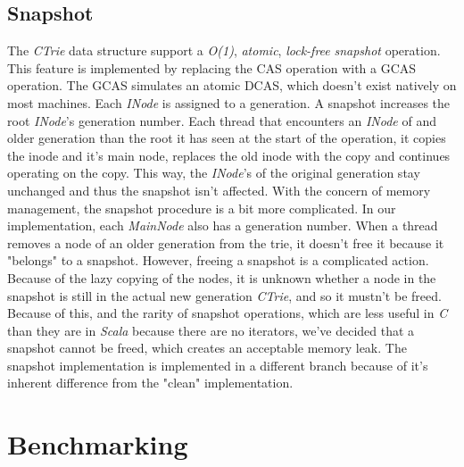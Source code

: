 \documentclass[conference]{IEEEtran}
\begin{document}
\subsection{Snapshot}
	The \textit{CTrie} data structure support a \textit{O(1)}, \textit{atomic}, \textit{lock-free} \textit{snapshot} operation. This feature is implemented by replacing the CAS operation with a GCAS operation. The GCAS simulates an atomic DCAS, which doesn't exist natively on most machines. Each \textit{INode} is assigned to a generation. A snapshot increases the root \textit{INode}'s generation number. Each thread that encounters an \textit{INode} of and older generation than the root it has seen at the start of the operation, it copies the inode and it's main node, replaces the old inode with the copy and continues operating on the copy. This way, the \textit{INode}'s of the original generation stay unchanged and thus the snapshot isn't affected. 
	With the concern of memory management, the snapshot procedure is a bit more complicated. In our implementation, each \textit{MainNode} also has a generation number. When a thread removes a node of an older generation from the trie, it doesn't free it because it "belongs" to a snapshot. However, freeing a snapshot is a complicated action. Because of the lazy copying of the nodes, it is unknown whether a node in the snapshot is still in the actual new generation \textit{CTrie}, and so it mustn't be freed. Because of this, and the rarity of snapshot operations, which are less useful in \textit{C} than they are in \textit{Scala} because there are no iterators, we've decided that a snapshot cannot be freed, which creates an acceptable memory leak.
	The snapshot implementation\cite{snapshot-cictrie} is implemented in a different branch because of it's inherent difference from the "clean" implementation.

\section{Benchmarking}
\end{document}
